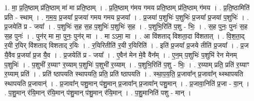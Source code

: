 \documentclass[17pt]{extarticle}
\begin{document}
1. मा॒ प्र॒ति॒ष्ठाम् प्र॑ति॒ष्ठाम् मा॑ मा प्रति॒ष्ठाम् । . प्र॒ति॒ष्ठाम् ग॑मय गमय प्रति॒ष्ठाम् प्र॑ति॒ष्ठाम् ग॑मय । . प्र॒ति॒ष्ठामिति॑ प्रति - स्थाम् । . ग॒म॒य॒ प्र॒जया᳚ प्र॒जया॑ गमय गमय प्र॒जया᳚ । . प्र॒जया॑ प॒शुभिः॑ प॒शुभिः॑ प्र॒जया᳚ प्र॒जया॑ प॒शुभिः॑ । . प्र॒जयेति॑ प्र - जया᳚ । . प॒शुभिः॑ स॒ह स॒ह प॒शुभिः॑ प॒शुभिः॑ स॒ह । . प॒शुभि॒रिति॑ प॒शु - भिः॒ । . स॒ह पुनः॒ पुनः॑ स॒ह स॒ह पुनः॑ । . पुन॑र् मा मा॒ पुनः॒ पुन॑र् मा । . मा ऽऽमा॒ मा । . आ वि॑शताद् विशता॒दा वि॑शतात् । . वि॒श॒ता॒द् र॒यी र॒यिर् वि॑शताद् विशताद् र॒यिः । . र॒यिरितीति॑ र॒यी र॒यिरिति॑ । . इति॑ प्र॒जया᳚ प्र॒जये तीति॑ प्र॒जया᳚ । . प्र॒ज यै॒वैव प्र॒जया᳚ प्र॒ज यै॒व । . प्र॒जयेति॑ प्र - जया᳚ । . ए॒वैन॑ मेन मे॒वै वैन᳚म् । . ए॒न॒म् प॒शुभिः॑ प॒शुभि॑ रेन मेनम् प॒शुभिः॑ । . प॒शुभी॑ र॒य्याꣳ र॒य्याम् प॒शुभिः॑ प॒शुभी॑ र॒य्याम् । . प॒शुभि॒रिति॑ प॒शु - भिः॒ । . र॒य्याम् प्रति॒ प्रति॑ र॒य्याꣳ र॒य्याम् प्रति॑ । . प्रति॑ ष्ठापयति स्थापयति॒ प्रति॒ प्रति॑ ष्ठापयति । . स्था॒प॒य॒ति॒ प्र॒जावा᳚न् प्र॒जावा᳚न् थ्स्थापयति स्थापयति प्र॒जावान्॑ । . प्र॒जावा᳚न् पशु॒मान् प॑शु॒मान् प्र॒जावा᳚न् प्र॒जावा᳚न् पशु॒मान् । . प्र॒जावा॒निति॑ प्र॒जा - वा॒न् । . प॒शु॒मान् र॑यि॒मान् र॑यि॒मान् प॑शु॒मान् प॑शु॒मान् र॑यि॒मान् । . प॒शु॒मानिति॑ पशु - मान् । \newline
\end{document}
